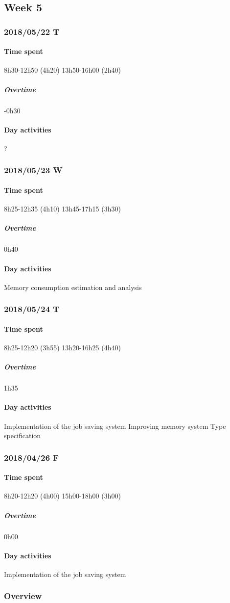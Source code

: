\subsection{Week 5}
\subsubsection{2018/05/22 T}
\paragraph{Time spent}
{8h30}-{12h50} (4h20)
{13h50}-{16h00} (2h40)

\subparagraph{Overtime}
-0h30

\paragraph{Day activities}
?

\subsubsection{2018/05/23 W}
\paragraph{Time spent}
{8h25}-{12h35} (4h10)
{13h45}-{17h15} (3h30) 

\subparagraph{Overtime}
0h40

\paragraph{Day activities}
Memory consumption estimation and analysis

\subsubsection{2018/05/24 T}
\paragraph{Time spent}
{8h25}-{12h20} (3h55)
{13h20}-{16h25} (4h40) 

\subparagraph{Overtime}
1h35

\paragraph{Day activities}
Implementation of the job saving system
Improving memory system
Type specification

\subsubsection{2018/04/26 F}
\paragraph{Time spent}
{8h20}-{12h20} (4h00)
{15h00}-{18h00} (3h00) 

\subparagraph{Overtime}
0h00

\paragraph{Day activities}
Implementation of the job saving system

\subsubsection{Overview}